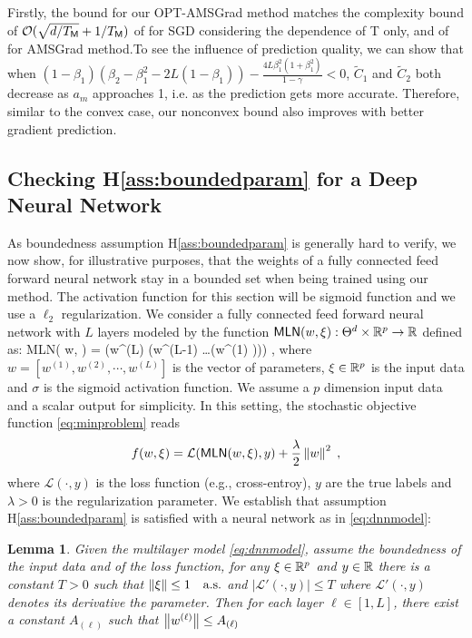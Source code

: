 \documentclass[twoside]{article}
\newtheorem{Lemma}{Lemma}
\begin{document}
Firstly, the bound for our OPT-AMSGrad method matches the complexity bound of $\mathcal{O}( \sqrt{d/T_{\sf M}} + 1/T_{\sf M} )$ of \citep{ghadimi2013stochastic} for SGD considering the dependence of T only, and of \citep{ZTYCG18} for AMSGrad method.To see the influence of prediction quality, we can show that when $(1-\beta_1)(\beta_2-\beta_1^2-2L(1-\beta_1))-\frac{4L\beta_1^2(1+\beta_1^2)}{1-\gamma}<0$, $\tilde C_1$ and $\tilde C_2$ both decrease as $a_m$ approaches 1, i.e. as the prediction gets more accurate. Therefore, similar to the convex case, our nonconvex bound also improves with better gradient prediction.


\subsection{Checking H\ref{ass:boundedparam} for a Deep Neural Network}

As boundedness assumption H\ref{ass:boundedparam} is generally hard to verify, we now show, for illustrative purposes, that the weights of a fully connected feed forward neural network stay in a bounded set when being trained using our method. 
The activation function for this section will be sigmoid function and we use a $\ell_2$ regularization. 
We consider a fully connected feed forward neural network with $L$ layers modeled by the function $\textsf{MLN}(w, \xi): \Theta^d \times \mathbb{R}^p \to \mathbb{R}$ defined as:
\beq\label{eq:dnnmodel}
\textsf{MLN}( w, \xi) = \sigma\left(w^{(L)} \sigma\left(w^{(L-1)} \ldots \sigma\left(w^{(1)} \xi \right)\right)\right) \eqsp,
\eeq
where $w = [w^{(1)}, w^{(2)}, \cdots , w^{(L)}]$ is the vector of parameters, $\xi \in \mathbb{R}^p$ is the input data and $\sigma$ is the sigmoid activation function. We assume a $p$ dimension input data and a scalar output for simplicity.
In this setting, the stochastic objective function \eqref{eq:minproblem} reads 
$$
f(w, \xi) = \mathcal{L}(\textsf{MLN}( w, \xi), y) +\frac{\lambda}{2}\left\Vert w \right\Vert^2\;,
$$
where $\mathcal{L}(\cdot, y)$ is the loss function (e.g., cross-entroy), $y$ are the true labels and $\lambda >0$ is the regularization parameter.
We establish that assumption H\ref{ass:boundedparam} is satisfied with a neural network as in \eqref{eq:dnnmodel}:
\begin{Lemma}\label{lem:dnnh2}
Given the multilayer model \eqref{eq:dnnmodel}, assume the boundedness of the input data and of the loss function, \ie for any $\xi \in \mathbb{R}^p$ and $y \in \mathbb{R}$ there is a constant $T >0$ such that $\left\Vert \xi \right\Vert \leq 1 \quad \textrm{a.s.}$ and $|\mathcal{L}'(\cdot, y)| \leq T$ where $\mathcal{L}'(\cdot, y)$ denotes its derivative \wrt the parameter. Then for each layer $\ell \in [1,L]$, there exist a constant $A_{(\ell)}$ such that $\left\Vert w^{(\ell)} \right\Vert \leq A_{(\ell)}$
\end{Lemma}
\end{document}
